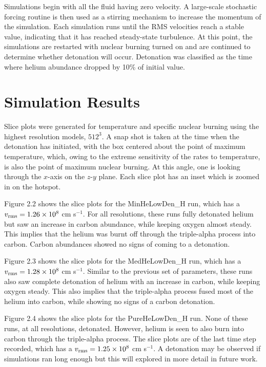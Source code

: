 \documentclass{aastex63}
\begin{document}
Simulations begin with all the fluid having zero velocity. A large-scale stochastic forcing routine is then used as a stirring mechanism to increase the momentum of the simulation. Each simulation runs until the RMS velocities reach a stable value, indicating that it has reached steady-state turbulence. At this point, the simulations are restarted with nuclear burning turned on and are continued to determine whether detonation will occur. Detonation was classified as the time where helium abundance dropped by 10\% of initial value.

\section{Simulation Results}

Slice plots were generated for temperature and specific nuclear burning using the highest resolution models, $512^3$. A snap shot is taken at the time when the detonation has initiated, with the box centered about the point of maximum temperature, which, owing to the extreme sensitivity of the rates to temperature, is also the point of maximum nuclear burning. At this angle, one is looking through the $x$-axis on the $z$-$y$ plane. Each slice plot has an inset which is zoomed in on the hotspot.

Figure 2.2 shows the slice plots for the MinHeLowDen\_H run, which has a $v_{\rm rms} = 1.26 \times 10^8$ cm s$^{-1}$. For all resolutions, these runs fully detonated helium but saw an increase in carbon abundance, while keeping oxygen almost steady. This implies that the helium was burnt off through the triple-alpha process into carbon. Carbon abundances showed no signs of coming to a detonation.

Figure 2.3 shows the slice plots for the MedHeLowDen\_H run, which has a $v_{\rm rms} = 1.28 \times 10^8$ cm s$^{-1}$. Similar to the previous set of parameters, these runs also saw complete detonation of helium with an increase in carbon, while keeping oxygen steady. This also implies that the triple-alpha process fused most of the helium into carbon, while showing no signs of a carbon detonation.

Figure 2.4 shows the slice plots for the PureHeLowDen\_H run. None of these runs, at all resolutions, detonated. However, helium is seen to also burn into carbon through the triple-alpha process. The slice plots are of the last time step recorded, which has a $v_{\rm rms} = 1.25 \times 10^8$ cm s$^{-1}$. A detonation may be observed if simulations ran long enough but this will explored in more detail in future work.
\end{document}
